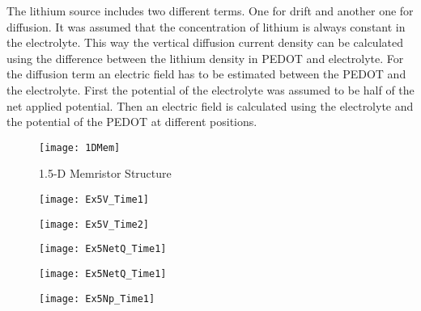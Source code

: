 The lithium source includes two different terms. One for drift and another one for diffusion. It was assumed that the concentration of lithium is always constant in the electrolyte. This way the vertical diffusion current density can be calculated using the difference between the lithium density in PEDOT and electrolyte. For the diffusion term an electric field has to be estimated between the PEDOT and the electrolyte. First the potential of the electrolyte was assumed to be half of the net applied potential. Then an electric field is calculated using the electrolyte and the potential of the PEDOT at different positions.
  
\begin{figure}[!htp]
\centering
\texttt{[image: 1DMem]}
\caption{1.5-D Memristor Structure} 
\label{MemStc15}
\end{figure}


\begin{landscape}
\begin{figure}[!htp]
\centering
\texttt{[image: Ex5V\_Time1]}
\caption{} 
\label{}
\end{figure}
\end{landscape}

\begin{landscape}
\begin{figure}[!htp]
\centering
\texttt{[image: Ex5V\_Time2]}
\caption{} 
\label{}
\end{figure}
\end{landscape}

\begin{landscape}
\begin{figure}[!htp]
\centering
\texttt{[image: Ex5NetQ\_Time1]}
\caption{} 
\label{}
\end{figure}
\end{landscape}

\begin{landscape}
\begin{figure}[!htp]
\centering
\texttt{[image: Ex5NetQ\_Time1]}
\caption{} 
\label{}
\end{figure}
\end{landscape}

\begin{landscape}
\begin{figure}[!htp]
\centering
\texttt{[image: Ex5Np\_Time1]}
\caption{} 
\label{}
\end{figure}
\end{landscape}

